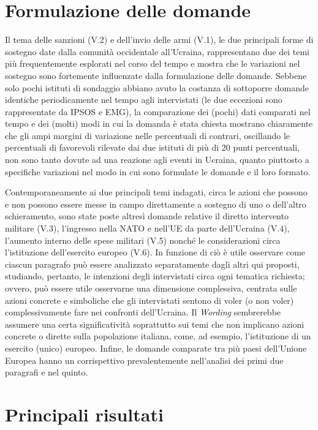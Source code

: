 \documentclass[
]{book}
\begin{document}
\hypertarget{formulazione-delle-domande-3}{%
\section{Formulazione delle domande}\label{formulazione-delle-domande-3}}

Il tema delle sanzioni (V.2) e dell'invio delle armi (V.1), le due principali forme di sostegno date dalla comunità occidentale all'Ucraina, rappresentano due dei temi più frequentemente esplorati nel corso del tempo e mostra che le variazioni nel sostegno sono fortemente influenzate dalla formulazione delle domande. Sebbene solo pochi istituti di sondaggio abbiano avuto la costanza di sottoporre domande identiche periodicamente nel tempo agli intervistati (le due eccezioni sono rappresentate da IPSOS e EMG), la comparazione dei (pochi) dati comparati nel tempo e dei (molti) modi in cui la domanda è stata chiesta mostrano chiaramente che gli ampi margini di variazione nelle percentuali di contrari, oscillando le percentuali di favorevoli rilevate dai due istituti di più di 20 punti percentuali, non sono tanto dovute ad una reazione agli eventi in Ucraina, quanto piuttosto a specifiche variazioni nel modo in cui sono formulate le domande e il loro formato.

Contemporaneamente ai due principali temi indagati, circa le azioni che possono e non possono essere messe in campo direttamente a sostegno di uno o dell'altro schieramento, sono state poste altresì domande relative il diretto intervento militare (V.3), l'ingresso nella NATO e nell'UE da parte dell'Ucraina (V.4), l'aumento interno delle spese militari (V.5) nonché le considerazioni circa l'istituzione dell'esercito europeo (V.6).
In funzione di ciò è utile osservare come ciascun paragrafo può essere analizzato separatamente dagli altri qui proposti, studiando, pertanto, le intenzioni degli intervistati circa ogni tematica richiesta; ovvero, può essere utile osservarne una dimensione complessiva, centrata sulle azioni concrete e simboliche che gli intervistati sentono di voler (o non voler) complessivamente fare nei confronti dell'Ucraina.
Il \emph{Wording} sembrerebbe assumere una certa significatività soprattutto sui temi che non implicano azioni concrete o dirette sulla popolazione italiana, come, ad esempio, l'istituzione di un esercito (unico) europeo.
Infine, le domande comparate tra più paesi dell'Unione Europea hanno un corrispettivo prevalentemente nell'analisi dei primi due paragrafi e nel quinto.

\hypertarget{principali-risultati-3}{%
\section{Principali risultati}\label{principali-risultati-3}}
\end{document}
